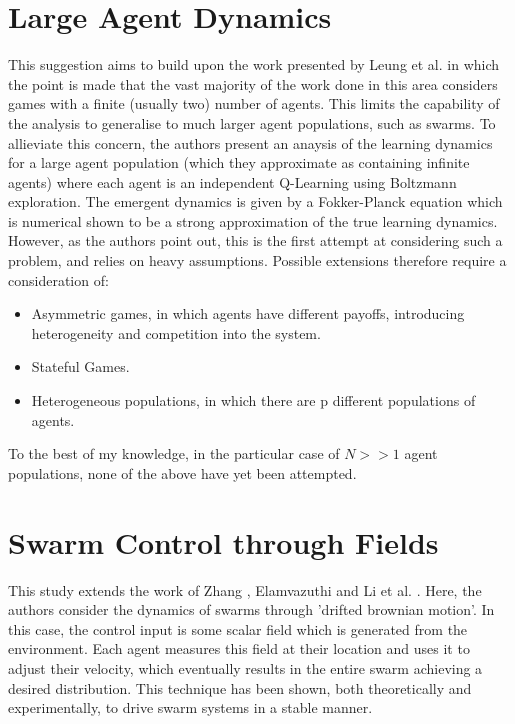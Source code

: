 \documentclass[.../main.tex]{subfiles}
\begin{document}
    \section{Large Agent Dynamics} \label{sec::Large_Agent_Dynamics}
    This suggestion aims to build upon the work presented by Leung et
    al. \cite{Hu2019} in which the point is made that the vast
    majority of the work done in this area considers games with a
    finite (usually two) number of agents. This limits the capability
    of the analysis to generalise to much larger agent populations,
    such as swarms. To allieviate this concern, the authors present an
    anaysis of the learning dynamics for a large agent population
    (which they approximate as containing infinite agents) where each
    agent is an independent Q-Learning using Boltzmann
    exploration. The emergent dynamics is given by a Fokker-Planck
    equation which is numerical shown to be a strong approximation of
    the true learning dynamics. However, as the authors point out,
    this is the first attempt at considering such a problem, and
    relies on heavy assumptions.  Possible extensions therefore
    require a consideration of:

    \begin{itemize}
        \item Asymmetric games, in which agents have different
          payoffs, introducing heterogeneity and competition into the
          system. 
        \item Stateful Games. 
        \item Heterogeneous populations, in which there are p different populations of agents.
    \end{itemize}

    To the best of my knowledge, in the particular case of $N >> 1$ agent populations, none of the
    above have yet been attempted.

    \section{Swarm Control through Fields} \label{sec::Swarm_Field_Control}
    This study extends the work of Zhang \cite{Zhang2018}, Elamvazuthi \cite{Elamvazhuthi2019} and
	Li et al. \cite{Li2017}. Here, the authors consider the dynamics of swarms through 'drifted
	brownian motion'. In this case, the control input is some scalar field which is generated from the
	environment. Each agent measures this field at their location and uses it to adjust their
	velocity, which eventually results in the entire swarm achieving a desired distribution. This technique
	has been shown, both theoretically and experimentally, to drive swarm systems in a stable
	manner.
\end{document}

